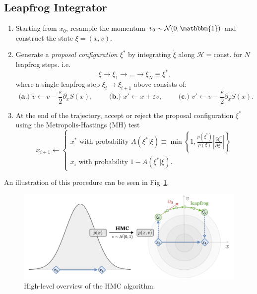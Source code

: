 \documentclass[a4paper,11pt]{article}
\newcommand{\acceptProb}{%
            A(\xi^{\ast}|\xi) \equiv \min\left\{1,
            \frac{p(\xi^{\ast})}{p(\xi)}%
        \left|\frac{\partial \xi^{\ast}}{\partial \xi^{T}}\right|\right\}
    }
\begin{document}
\subsection{\label{subsec:lfint}Leapfrog Integrator}
%
\begin{enumerate}
    \item Starting from \(x_{0}\), resample the momentum \(v_{0}\sim
        \mathcal{N} (0, \mathbbm{1})\) and construct the state \(\xi =
        (x, v)\).
    \item Generate a \emph{proposal configuration} \(\xi^{\ast}\) by
        integrating \(\dot\xi\) along \(\mathcal{H} = \mathrm{const.}\)
        for \(N\) leapfrog steps.
        i.e.
        \begin{equation}
            \xi \rightarrow \xi_{1}\rightarrow\ldots\rightarrow
            \xi_{N} \equiv \xi^{\ast},
        \end{equation}
        where a single leapfrog step \(\xi_{i} \rightarrow \xi_{i+1}\) above
        consists of: 
        \begin{equation}
            \textbf{ (a.) }%
              \tilde{v}\leftarrow v - \frac{\varepsilon}{2}\partial_{x} S(x),
            \quad\quad
            \textbf{ (b.) }%
              x' \leftarrow x + \varepsilon \tilde{v},
            \quad\quad
            \textbf{ (c.) }%
              v' \leftarrow \tilde{v} - \frac{\varepsilon}{2}\partial_{x} S(x).
        \end{equation}
    \item At the end of the trajectory, accept or reject the proposal
        configuration \(\xi^{\ast}\) using the Metropolis-Hastings (MH) test
        \begin{equation}
            x_{i+1} \leftarrow
            \begin{cases}
                x^{\ast}\text{ with probability } \acceptProb \\
                x_{i}\text{ with probability } 1 - A(\xi^{\ast}|\xi).
            \end{cases}
        \end{equation}
\end{enumerate}
%
An illustration of this procedure can be seen in Fig~\ref{fig:hmc}.
%
\begin{figure}[htpb]
    \centering
    \includegraphics[width=\textwidth]{assets/hmc.pdf}
    \caption{\label{fig:hmc}High-level overview of the HMC algorithm.}
\end{figure}
%
\end{document}
